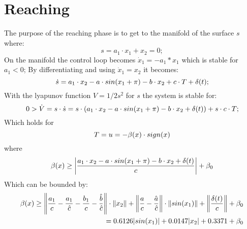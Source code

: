 \chapter{Reaching}

The purpose of the reaching phase is to get to the manifold of the surface $s $ where:
\begin{equation}
s = a_1 \cdot x_1 + x_2 = 0;
\end{equation}
On the manifold the control loop becomes $ \dot{x}_1 = - a_1 *x_1   $ which is stable for $ a_1< 0$;
By differentiating and using $ \dot{x}_1 = x_2 $ it becomes:
\begin{equation}
\dot{s} = a_1 \cdot x_2 - a \cdot sin(x_1 + \pi) - b \cdot x_2 + c \cdot T + \delta (t);
\end{equation}
With the lyapunov function $V = 1/2 s^2 $ for $ s $ the system is stable for:
\begin{equation}
 0 > \dot{V} = s\cdot \dot{s} =  s \cdot (a_1 \cdot x_2 - a \cdot sin(x_1 + \pi) - b \cdot x_2  + \delta (t) ) + s \cdot c \cdot T;
\end{equation}
Which holds for
\begin{equation}
T = u = -\beta (x) \cdot sign(x)
\end{equation}
where
\begin{equation}
\beta (x) \geq \left| \frac{a_1 \cdot x_2 - a \cdot sin(x_1 + \pi) - b \cdot x_2  + \delta (t)}{c} \right| + \beta_0
\end{equation}
Which can be bounded by:
\begin{equation}
	\begin{split}
\beta (x) \geq \left\Vert \frac{a_1}{c} - \frac{a_1}{\hat{c}} -  \frac{b_1}{c} - \frac{\hat{b}}{\hat{c}}  \right\Vert \cdot \left\Vert x_2 \right\Vert + \left\Vert \frac{a}{c} - \frac{\hat{a}}{\hat{c}}  \right\Vert \cdot \left\Vert sin(x_1) \right\Vert + \left\Vert \frac{\delta (t)}{c} \right\Vert + \beta_0 \\
= 0.6126 |sin(x_1)| + 0.0147 |x_2| + 0.3371 + \beta_0
\end{split}
\end{equation}